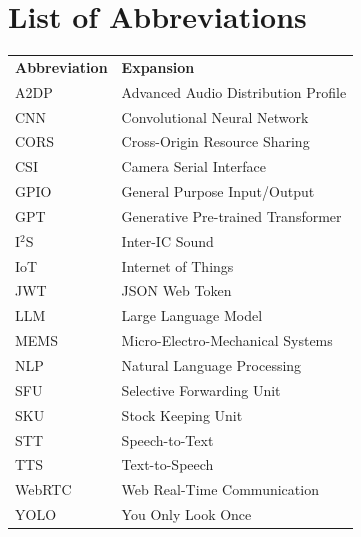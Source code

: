 \newpage
\chapter*{List of Abbreviations}
%
\begin{center}
\begin{tabular}{p{}p{}}
\bfseries Abbreviation & \bfseries Expansion \\
A2DP         & Advanced Audio Distribution Profile \\
CNN          & Convolutional Neural Network \\
CORS         & Cross-Origin Resource Sharing \\
CSI          & Camera Serial Interface \\
GPIO         & General Purpose Input/Output \\
GPT          & Generative Pre-trained Transformer \\
I$^2$S       & Inter-IC Sound \\
IoT          & Internet of Things \\
JWT          & JSON Web Token \\
LLM          & Large Language Model \\
MEMS         & Micro-Electro-Mechanical Systems \\
NLP          & Natural Language Processing \\
SFU          & Selective Forwarding Unit \\
SKU          & Stock Keeping Unit \\
STT          & Speech-to-Text \\
TTS          & Text-to-Speech \\
WebRTC       & Web Real-Time Communication \\
YOLO         & You Only Look Once \\
\end{tabular}
\end{center}
